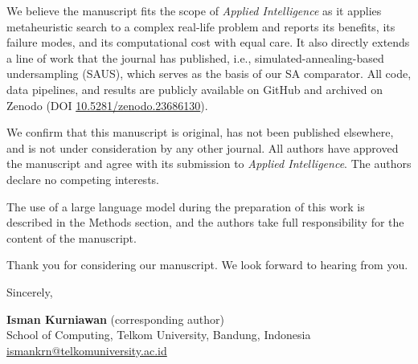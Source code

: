 \documentclass[11pt,a4paper]{article}
\begin{document}
We believe the manuscript fits the scope of \emph{Applied Intelligence}
as it applies metaheuristic search to a complex real-life problem and
reports its benefits, its failure modes, and its computational cost
with equal care. It also directly extends a line of work that the
journal has published, i.e., simulated-annealing-based undersampling
(SAUS), which serves as the basis of our SA comparator. All code, data
pipelines, and results are publicly available on GitHub and archived on
Zenodo (DOI \href{https://doi.org/10.5281/zenodo.23686130}{10.5281/zenodo.23686130}).

We confirm that this manuscript is original, has not been published
elsewhere, and is not under consideration by any other journal. All
authors have approved the manuscript and agree with its submission to
\emph{Applied Intelligence}. The authors declare no competing interests.

The use of a large language model during the preparation of this work
is described in the Methods section, and the authors take full
responsibility for the content of the manuscript.

Thank you for considering our manuscript. We look forward to hearing
from you.

Sincerely,

\medskip
\textbf{Isman Kurniawan} (corresponding author)\\
School of Computing, Telkom University, Bandung, Indonesia\\
\href{mailto:ismankrn@telkomuniversity.ac.id}{ismankrn@telkomuniversity.ac.id}
\end{document}
